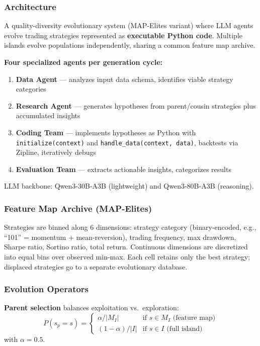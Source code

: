 \documentclass[11pt,a4paper]{article}
\begin{document}
\subsubsection{Architecture}

A quality-diversity evolutionary system (MAP-Elites variant) where LLM agents evolve trading strategies represented as \textbf{executable Python code}. Multiple islands evolve populations independently, sharing a common feature map archive.

\textbf{Four specialized agents per generation cycle:}
\begin{enumerate}
    \item \textbf{Data Agent} --- analyzes input data schema, identifies viable strategy categories
    \item \textbf{Research Agent} --- generates hypotheses from parent/cousin strategies plus accumulated insights
    \item \textbf{Coding Team} --- implements hypotheses as Python with \texttt{initialize(context)} and \texttt{handle\_data(context, data)}, backtests via Zipline, iteratively debugs
    \item \textbf{Evaluation Team} --- extracts actionable insights, categorizes results
\end{enumerate}

LLM backbone: Qwen3-30B-A3B (lightweight) and Qwen3-80B-A3B (reasoning).

\subsubsection{Feature Map Archive (MAP-Elites)}

Strategies are binned along 6 dimensions: strategy category (binary-encoded, e.g., ``101'' = momentum + mean-reversion), trading frequency, max drawdown, Sharpe ratio, Sortino ratio, total return. Continuous dimensions are discretized into equal bins over observed min-max. Each cell retains only the best strategy; displaced strategies go to a separate evolutionary database.

\subsubsection{Evolution Operators}

\textbf{Parent selection} balances exploitation vs.\ exploration:
\begin{equation}
P(s_p = s) = \begin{cases} \alpha / |M_I| & \text{if } s \in M_I \text{ (feature map)} \\ (1-\alpha) / |I| & \text{if } s \in I \text{ (full island)} \end{cases}
\end{equation}
with $\alpha = 0.5$.
\end{document}
